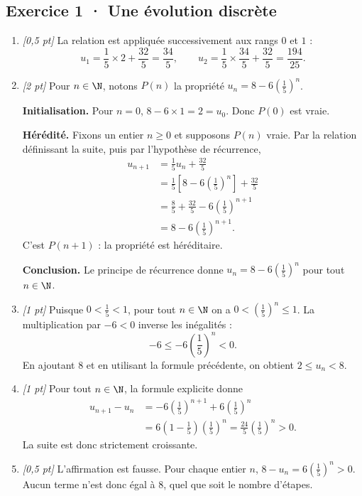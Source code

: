 \subsection*{Exercice 1 · Une évolution discrète}\begin{enumerate}

\item \textit{[0,5 pt]} La relation est appliquée successivement aux rangs $0$ et $1$ :\[u_1=\frac{1}{5}\times 2+\frac{32}{5}=\frac{34}{5},\qquad u_2=\frac{1}{5}\times \frac{34}{5}+\frac{32}{5}=\frac{194}{25}.\]

\item \textit{[2 pt]} Pour $n\in\N$, notons $P(n)$ la propriété $u_n=8-6\left(\frac{1}{5}\right)^n$.
\par\smallskip\textbf{Initialisation.} Pour $n=0$, $8-6\times1=2=u_0$. Donc $P(0)$ est vraie.
\par\smallskip\textbf{Hérédité.} Fixons un entier $n\ge0$ et supposons $P(n)$ vraie. Par la relation définissant la suite, puis par l'hypothèse de récurrence,
\[\begin{aligned}u_{n+1}&=\frac{1}{5}u_n+\frac{32}{5}\\
&=\frac{1}{5}\left[8-6\left(\frac{1}{5}\right)^n\right]+\frac{32}{5}\\
&=\frac{8}{5}+\frac{32}{5}-6\left(\frac{1}{5}\right)^{n+1}\\
&=8-6\left(\frac{1}{5}\right)^{n+1}.
\end{aligned}\]
C'est $P(n+1)$ : la propriété est héréditaire.
\par\smallskip\textbf{Conclusion.} Le principe de récurrence donne $u_n=8-6\left(\frac{1}{5}\right)^n$ pour tout $n\in\N$.

\item \textit{[1 pt]} Puisque $0<\frac{1}{5}<1$, pour tout $n\in\N$ on a $0<(\frac{1}{5})^n\le1$. La multiplication par $-6<0$ inverse les inégalités :
\[-6\le-6(\frac{1}{5})^n<0.\]
En ajoutant $8$ et en utilisant la formule précédente, on obtient $2\le u_n<8$.

\item \textit{[1 pt]} Pour tout $n\in\N$, la formule explicite donne
\[\begin{aligned}u_{n+1}-u_n&=-6(\frac{1}{5})^{n+1}+6(\frac{1}{5})^n\\&=6(1-\frac{1}{5})(\frac{1}{5})^n=\frac{24}{5}(\frac{1}{5})^n>0.\end{aligned}\]
La suite est donc strictement croissante.

\item \textit{[0,5 pt]} L'affirmation est fausse. Pour chaque entier $n$, $8-u_n=6(\frac{1}{5})^n>0$. Aucun terme n'est donc égal à $8$, quel que soit le nombre d'étapes.

\end{enumerate}

